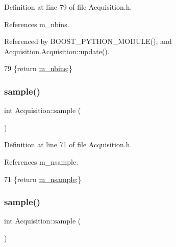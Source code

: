Definition at line 79 of file Acquisition.\+h.



References m\+\_\+nbins.



Referenced by B\+O\+O\+S\+T\+\_\+\+P\+Y\+T\+H\+O\+N\+\_\+\+M\+O\+D\+U\+L\+E(), and Acquisition.\+Acquisition\+::update().


\begin{DoxyCode}
79 \{\textcolor{keywordflow}{return} \hyperlink{classAcquisition_a05bccdc4b9ada37beaeba8794ccef12d}{m\_nbins};\}
\end{DoxyCode}
\mbox{\label{classAcquisition_a83181975c0746e5837d53933031e7b62}} 
\subsubsection{\texorpdfstring{sample()}{sample()}\hspace{0.1cm}{\footnotesize\ttfamily [1/2]}}
{\footnotesize\ttfamily int Acquisition\+::sample (\begin{DoxyParamCaption}{ }\end{DoxyParamCaption})\hspace{0.3cm}{\ttfamily [inline]}}



Definition at line 71 of file Acquisition.\+h.



References m\+\_\+nsample.


\begin{DoxyCode}
71 \{\textcolor{keywordflow}{return} \hyperlink{classAcquisition_a26d0f1a44309ffac49c365b7ee568ab2}{m\_nsample};\}
\end{DoxyCode}
\mbox{\label{classAcquisition_a83181975c0746e5837d53933031e7b62}} 
\subsubsection{\texorpdfstring{sample()}{sample()}\hspace{0.1cm}{\footnotesize\ttfamily [2/2]}}
{\footnotesize\ttfamily int Acquisition\+::sample (\begin{DoxyParamCaption}{ }\end{DoxyParamCaption})\hspace{0.3cm}{\ttfamily [inline]}}



